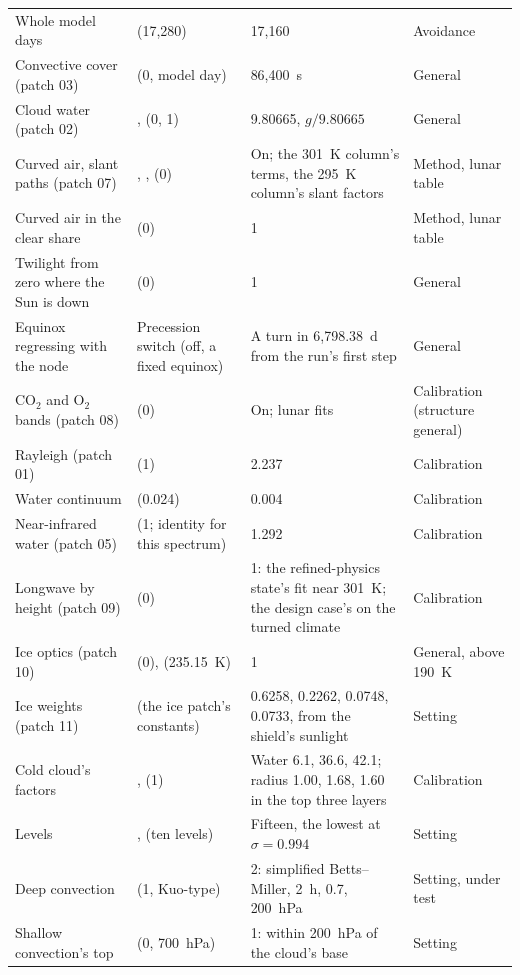 {\begin{xltabular}{\textwidth}{@{}>{\raggedright\arraybackslash}p{0.18\textwidth}>{\raggedright\arraybackslash}p{0.27\textwidth}L>{\raggedright\arraybackslash}p{0.13\textwidth}@{}}
Whole model days &  (17,280) & 17,160 & Avoidance \\
Convective cover (patch 03) &  (0, model day) & 86,400~s & General \\
Cloud water (patch 02) & ,  (0, 1) & 9.80665, $g/9.80665$ & General \\
Curved air, slant paths (patch 07) & , ,  (0) & On; the 301~K column's terms, the 295~K column's slant factors & Method, lunar table \\
Curved air in the clear share &  (0) & 1 & Method, lunar table \\
Twilight from zero where the Sun is down &  (0) & 1 & General \\
Equinox regressing with the node & Precession switch (off, a fixed equinox) & A turn in 6,798.38~d from the run's first step & General \\
CO$_2$ and O$_2$ bands (patch 08) &  (0) & On; lunar fits & Calibration (structure general) \\
Rayleigh (patch 01) &  (1) & 2.237 & Calibration \\
Water continuum &  (0.024) & 0.004 & Calibration \\
Near-infrared water (patch 05) &  (1; identity for this spectrum) & 1.292 & Calibration \\
Longwave by height (patch 09) &  (0) & 1: the refined-physics state's fit near 301~K; the design case's on the turned climate & Calibration \\
Ice optics (patch 10) &  (0),  (235.15~K) & 1 & General, above 190~K \\
Ice weights (patch 11) &  (the ice patch's constants) & 0.6258, 0.2262, 0.0748, 0.0733, from the shield's sunlight & Setting \\
Cold cloud's factors & ,  (1) & Water 6.1, 36.6, 42.1; radius 1.00, 1.68, 1.60 in the top three layers & Calibration \\
Levels & ,  (ten levels) & Fifteen, the lowest at $\sigma = 0.994$ & Setting \\
Deep convection &  (1, Kuo-type) & 2: simplified Betts--Miller, 2~h, 0.7, 200~hPa & Setting, under test \\
Shallow convection's top &  (0, 700~hPa) & 1: within 200~hPa of the cloud's base & Setting \\

\end{xltabular}}
